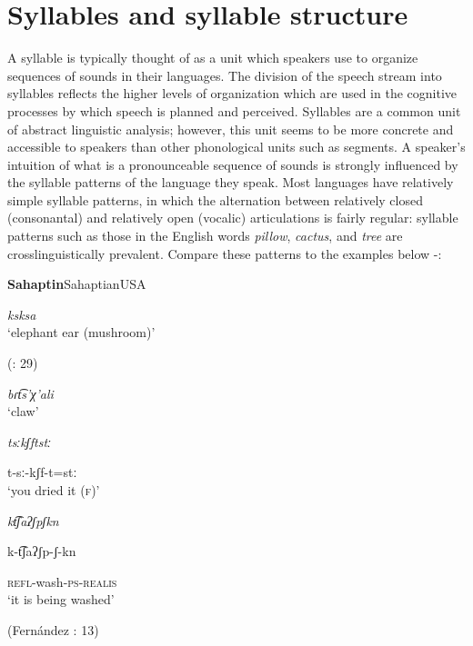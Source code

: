 \chapter{Syllables and syllable structure}\label{sec:1}

  A syllable is typically thought of as a unit which speakers use to organize sequences of sounds in their languages. The division of the speech stream into syllables reflects the higher levels of organization which are used in the cognitive processes by which speech is planned and perceived. Syllables are a common unit of abstract linguistic analysis; however, this unit seems to be more concrete and accessible to speakers than other phonological units such as segments. A speaker’s intuition of what is a pronounceable sequence of sounds is strongly influenced by the syllable patterns of the language they speak. Most languages have relatively simple syllable patterns, in which the alternation between relatively closed (consonantal) and relatively open (vocalic) articulations is fairly regular: syllable patterns such as those in the English words \textit{pillow}, \textit{cactus}, and \textit{tree} are crosslinguistically prevalent. Compare these patterns to the examples below -:

\ea\label{ex:1.1}
 \textbf{Sahaptin}{Sahaptian}{USA}

\textit{ksksa}\\
\glt ‘elephant ear (mushroom)’

(\citealt{HargusBeavert2006}: 29)
\z

\ea\label{ex:1.2}

\textit{bɾt͡s’χ’ali}\\
\glt ‘claw’
\citep[204]{Butskhrikidze2002}
\z

\ea\label{ex:1.3}

\textit{tsːkʃftstː}

t-sː-kʃf-t=stː\\
\glt ‘you dried it (\textsc{f})’
\citep[332]{Ridouane2008}
\z

\ea\label{ex:1.4}

\textit{kt͡ʃaʔʃpʃkn}

k-t͡ʃaʔʃp-ʃ-kn

\textsc{refl}-wash-\textsc{ps-realis}\\
\glt ‘it is being washed’

(Fernández \citealt{GarayHernández2006}: 13)
\z

